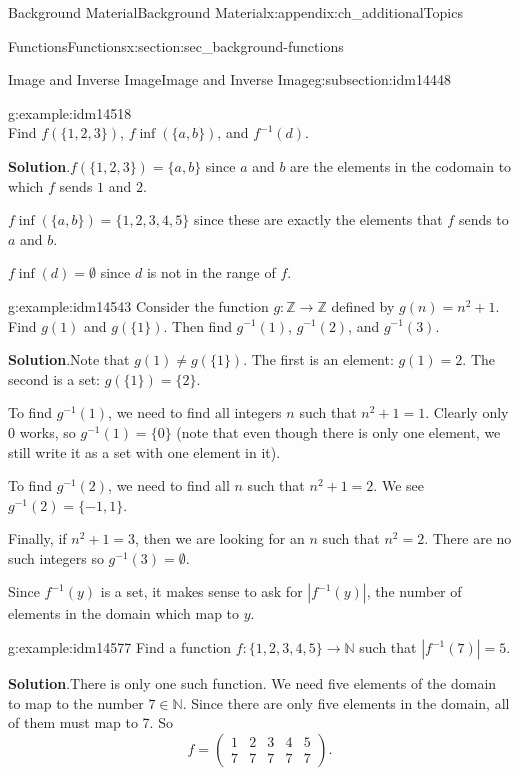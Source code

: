 \documentclass[oneside,10pt,]{book}
\numberwithin{equation}{chapter}
\def\N{\mathbb N}
\def\Z{\mathbb Z}
\def\inv{^{-1}}
\newcommand{\card}[1]{\left| #1 \right|}
\newcommand{\amp}{&}
\begin{document}
\begin{appendixptx}{Background Material}{}{Background Material}{}{}{x:appendix:ch_additionalTopics}
\begin{sectionptx}{Functions}{}{Functions}{}{}{x:section:sec_background-functions}
\begin{subsectionptx}{Image and Inverse Image}{}{Image and Inverse Image}{}{}{g:subsection:idm14448}
\begin{example}{}{g:example:idm14518}
\begin{equation*}
\end{equation*}
Find \(f(\{1,2,3\})\),  \(f\inf(\{a,b\})\), and \(f\inv(d)\).%
\par\smallskip%
\noindent\textbf{Solution}.\hypertarget{g:solution:idm14526}{}\quad{}\(f(\{1,2,3\}) = \{a,b\}\) since \(a\) and \(b\) are the elements in the codomain to which \(f\) sends \(1\) and \(2\).%
\par
\(f\inf(\{a,b\}) = \{1,2,3,4,5\}\) since these are exactly the elements that \(f\) sends to \(a\) and \(b\).%
\par
\(f\inf(d) = \emptyset\) since \(d\) is not in the range of \(f\).%
\end{example}
\begin{example}{}{g:example:idm14543}%
Consider the function \(g:\Z \to \Z\) defined by \(g(n) = n^2 + 1\). Find \(g(1)\) and \(g(\{1\})\).  Then find \(g\inv(1)\), \(g\inv(2)\), and \(g\inv(3)\).%
\par\smallskip%
\noindent\textbf{Solution}.\hypertarget{g:solution:idm14553}{}\quad{}Note that \(g(1) \ne g(\{1\})\).  The first is an element: \(g(1) = 2\).  The second is a set: \(g(\{1\}) = \{2\}\).%
\par
To find \(g\inv(1)\), we need to find all integers \(n\) such that \(n^2 + 1 = 1\). Clearly only 0 works, so \(g\inv(1) = \{0\}\) (note that even though there is only one element, we still write it as a set with one element in it).%
\par
To find \(g\inv(2)\), we need to find all \(n\) such that \(n^2 + 1 = 2\). We see \(g\inv(2) = \{-1,1\}\).%
\par
Finally, if \(n^2 + 1 = 3\), then we are looking for an \(n\) such that \(n^2 = 2\). There are no such integers so \(g\inv(3) = \emptyset\).%
\end{example}
Since \(f\inv(y)\) is a set, it makes sense to ask for \(\card{f\inv(y)}\), the number of elements in the domain which map to \(y\).%
\begin{example}{}{g:example:idm14577}%
Find a function \(f:\{1,2,3,4,5\} \to \N\) such that \(\card{f\inv(7)} = 5\).%
\par\smallskip%
\noindent\textbf{Solution}.\hypertarget{g:solution:idm14582}{}\quad{}There is only one such function. We need five elements of the domain to map to the number \(7 \in \N\). Since there are only five elements in the domain, all of them must map to 7. So%
\begin{equation*}
f = \begin{pmatrix}1 \amp 2 \amp 3 \amp 4 \amp 5 \\ 7 \amp 7 \amp 7 \amp 7 \amp 7\end{pmatrix}.

\end{equation*}
\end{example}
\end{subsectionptx}
\end{sectionptx}
\end{appendixptx}
\end{document}
